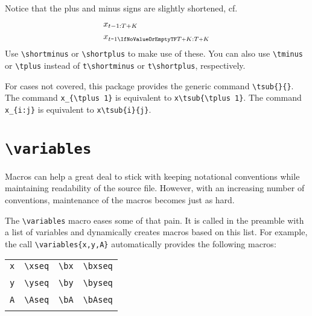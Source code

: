 \documentclass
[
twoside, %
]
{article}
\begin{document}
Notice that the plus and minus signs are slightly shortened, cf.
\begin{align*}
	&x_{t-1:T+K}\\
	&x\tsub{t\shortminus1}{T\shortplus K}
\end{align*}
Use \texttt{\textbackslash shortminus} or \texttt{\textbackslash shortplus} to make use of these.
You can also use \texttt{\textbackslash tminus} or \texttt{\textbackslash tplus} instead of \texttt{t\textbackslash shortminus} or \texttt{t\textbackslash shortplus}, respectively.

For cases not covered, this package provides the generic command \texttt{\textbackslash tsub\{\}\{\}}.
The command \texttt{x\_\{\textbackslash tplus 1\}} is equivalent to \texttt{x\textbackslash tsub\{\textbackslash tplus 1\}}.
The command \texttt{x\_\{i:j\}} is equivalent to \texttt{x\textbackslash tsub\{i\}\{j\}}.


\section{\texttt{\textbackslash variables}}
Macros can help a great deal to stick with keeping notational conventions while maintaining readability of the source file. However, with an increasing number of conventions, maintenance of the macros becomes just as hard.

The \texttt{\textbackslash variables} macro eases some of that pain. It is called in the preamble with a list of variables and dynamically creates macros based on this list. For example, the call \texttt{\textbackslash variables\{x,y,A\}} automatically provides the following macros:

\setlength{}
\begin{table}[h!]
	\centering
	\begin{tabular}{c|ccc}
		\texttt{x} & \texttt{\textbackslash xseq}& \texttt{\textbackslash bx}&  \texttt{\textbackslash bxseq}\\
				   & \xseq						 & \bx                       & \bxseq\\
		\texttt{y} & \texttt{\textbackslash yseq}& \texttt{\textbackslash by}&  \texttt{\textbackslash byseq}\\
		& \yseq						 & \by                       & \byseq\\
		\texttt{A} & \texttt{\textbackslash Aseq}& \texttt{\textbackslash bA}&  \texttt{\textbackslash bAseq}\\
		& \Aseq						 & \bA                       & \bAseq
	\end{tabular}
\end{table}
\setlength{}
\end{document}
